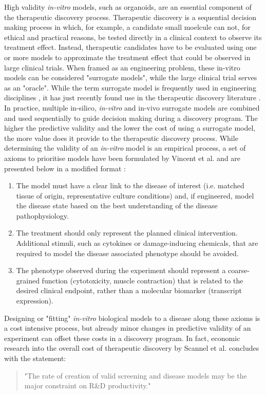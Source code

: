\begin{flushleft}
High validity \textit{in-vitro} models, such as organoids, are an essential component of the therapeutic discovery process. Therapeutic discovery is a sequential decision making process in which, for example, a candidate small moelcule can not, for ethical and practical reasons, be tested directly in a clinical context to observe its treatment effect. Instead, therapeutic candidates have to be evaluated using one or more models to approximate the treatment effect that could be observed in large clinical trials. When framed as an engineering problem, these in-vitro models can be considered "surrogate models", while the large clinical trial serves as an "oracle". While the term surrogate model is frequently used in engineering disciplines \citep{cozadLearningSurrogateModels2014}, it has just recently found use in the therapeutic discovery literature \citep{clydeProteinLigandDockingSurrogate2021}. In practice, multiple in-silico, \textit{in-vitro} and in-vivo surrogate models are combined and used sequentially to guide decision making during a discovery program. The higher the predictive validity and the lower the cost of using a surrogate model, the more value does it provide to the therapeutic discovery process. While determining the validity of an \textit{in-vitro} model is an empirical process, a set of axioms to prioritise models have been formulated by Vincent et al. and are presented below in a modified format \citep{vincentDevelopingPredictiveAssays2015} : 

\begin{enumerate}
    \item The model must have a clear link to the disease of interest (i.e. matched tissue of origin, representative culture conditions) and, if engineered, model the disease state based on the best understanding of the disease pathophysiology.
    \item The treatment should only represent the planned clinical intervention. Additional stimuli, such as cytokines or damage-inducing chemicals, that are required to model the disease associated phenotype should be avoided.
    \item The phenotype observed during the experiment should represent a coarse-grained function (cytotoxicity, muscle contraction) that is related to the desired clinical endpoint, rather than a molecular biomarker (transcript expression).
\end{enumerate}

Designing or "fitting" \textit{in-vitro} biological models to a disease along these axioms is a cost intensive process, but already minor changes in predictive validity of an experiment can offset these costs in a discovery program. In fact, economic research into the overall cost of therapeutic discovery by Scannel et al. \citep{scannellWhenQualityBeats2016} concludes with the statement:

\begin{quote}
"The rate of creation of valid screening and disease models may be the major constraint on R\&D productivity."
\end{quote}




\end{flushleft}